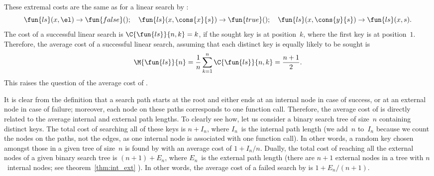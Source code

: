 These extremal costs are the same as for a linear search by :
\begin{equation*}
\fun{ls}(x,\el)          \rightarrow  \fun{false}();\quad
\fun{ls}(x,\cons{x}{s})  \rightarrow  \fun{true}();\quad
\fun{ls}(x,\cons{y}{s})  \rightarrow  \fun{ls}(x,s).
\end{equation*}
The cost of a successful linear search is \(\C{\fun{ls}}{n,k} = k\),
if the sought key is at position~\(k\), where the first key is at
position~\(1\). Therefore, the average cost of a successful linear
search, assuming that each distinct key is equally likely to be sought
is
\begin{equation*}
  \M{\fun{ls}}{n} = \frac{1}{n}\sum_{k=1}^{n}\C{\fun{ls}}{n,k} =
  \frac{n+1}{2}.
  \index{linear search}
  \index{ls@$\M{\fun{ls}}{n}$}
\end{equation*}
This raises the question of the average cost of
.


It is clear from the definition that a search path starts at the root
and either ends at an internal node in case of success, or at an
external node in case of failure; moreover, each node on these paths
corresponds to one function call. Therefore, the average cost of
 is directly related to the average
internal and
external path
lengths. To clearly see how, let us consider a binary search tree of
size~\(n\) containing distinct keys. The total cost of searching all
of these keys is \(n+I_n\), where \(I_n\)~is the internal path length
(we add~\(n\) to~\(I_n\) because we count the nodes on the paths, not
the edges, as one internal node is associated with one function
call). In other words, a random key chosen amongst those in a given
tree of size~\(n\) is found by  with an average cost of
\(1+I_n/n\). Dually, the total cost of reaching all the external nodes
of a given binary search tree is \((n+1)+E_n\), where \(E_n\)~is the
external path length (there are \(n+1\) external nodes in a tree
with \(n\)~internal nodes; see theorem~\ref{thm:int_ext}
). In other words, the average cost of a failed
search by  is \(1 + E_n/(n+1)\).

